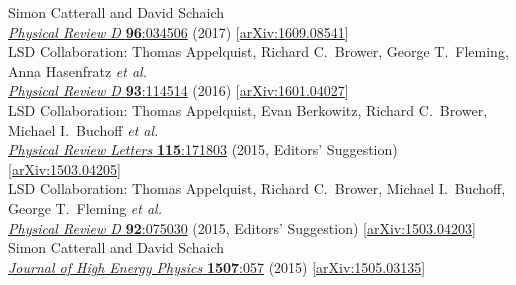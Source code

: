 \begin{spacelist}
\begin{revnumerate}
      Simon Catterall and David Schaich \\
      \href{http://dx.doi.org/10.1103/PhysRevD.96.034506}{\textit{Physical Review D} \textbf{96}:034506} (2017) [\href{http://arxiv.org/abs/1609.08541}{arXiv:1609.08541}]
    \pagebreakitem
       \\
      LSD Collaboration: Thomas Appelquist, Richard C.~Brower, George T.~Fleming, Anna Hasenfratz \textit{et al.} \\ %
      \href{http://dx.doi.org/10.1103/PhysRevD.93.114514}{\textit{Physical Review D} \textbf{93}:114514} (2016) [\href{http://arxiv.org/abs/1601.04027}{arXiv:1601.04027}]
    \pagebreakitem
       \\
      LSD Collaboration: Thomas Appelquist, Evan Berkowitz, Richard C.~Brower, Michael I.~Buchoff \textit{et al.} \\ %
      \href{http://dx.doi.org/10.1103/PhysRevLett.115.171803}{\textit{Physical Review Letters} \textbf{115}:171803} (2015, Editors' Suggestion) [\href{http://arxiv.org/abs/1503.04205}{arXiv:1503.04205}]
    \pagebreakitem
       \\
      LSD Collaboration: Thomas Appelquist, Richard C.~Brower, Michael I.~Buchoff, George T.~Fleming \textit{et al.} \\ %
      \href{http://dx.doi.org/10.1103/PhysRevD.92.075030}{\textit{Physical Review D} \textbf{92}:075030} (2015, Editors' Suggestion) [\href{http://arxiv.org/abs/1503.04203}{arXiv:1503.04203}]
    \pagebreakitem
       \\
      Simon Catterall and David Schaich \\
      \href{http://dx.doi.org/10.1007/JHEP07(2015)057}{\textit{Journal of High Energy Physics} \textbf{1507}:057} (2015) [\href{http://arxiv.org/abs/1505.03135}{arXiv:1505.03135}]

\end{revnumerate}
\end{spacelist}
